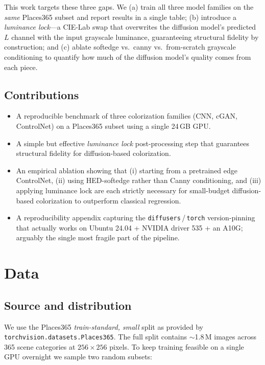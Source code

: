 \documentclass[conference]{IEEEtran}
\begin{document}
This work targets these three gaps. We (a) train all three model
families on the \emph{same} Places365 subset and report results in a
single table; (b) introduce a \emph{luminance lock}---a CIE-Lab swap
that overwrites the diffusion model's predicted $L$ channel with the
input grayscale luminance, guaranteeing structural fidelity by
construction; and (c) ablate softedge vs.\ canny vs.\ from-scratch
grayscale conditioning to quantify how much of the diffusion model's
quality comes from each piece.

\subsection{Contributions}
\begin{itemize}
  \item A reproducible benchmark of three colorization families
        (CNN, cGAN, ControlNet) on a Places365 subset using a single
        24\,GB GPU.
  \item A simple but effective \emph{luminance lock}
        post-processing step that guarantees structural fidelity for
        diffusion-based colorization.
  \item An empirical ablation showing that (i) starting from a
        pretrained edge ControlNet, (ii) using HED-softedge rather
        than Canny conditioning, and (iii) applying luminance lock are
        each strictly necessary for small-budget diffusion-based
        colorization to outperform classical regression.
  \item A reproducibility appendix capturing the
        \texttt{diffusers}\,/\,\texttt{torch} version-pinning that
        actually works on Ubuntu 24.04 + NVIDIA driver 535 + an
        A10G; arguably the single most fragile part of the pipeline.
\end{itemize}

\section{Data}\label{sec:data}

\subsection{Source and distribution}
We use the Places365 \emph{train-standard, small} split
\cite{zhou2017places} as provided by \texttt{torchvision.datasets.Places365}.
The full split contains $\sim$1.8\,M images across 365 scene categories
at $256\times256$ pixels. To keep training feasible on a single GPU
overnight we sample two random subsets:
\end{document}
